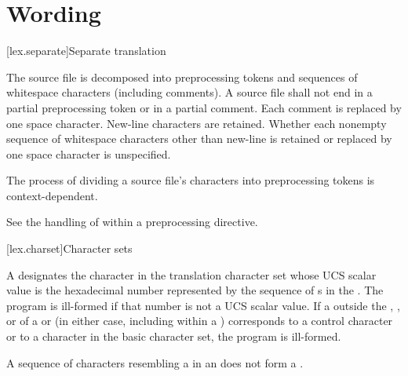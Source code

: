 \documentclass{wg21}
\begin{document}
\section{Wording}

[lex.separate]{Separate translation}


 The source file is decomposed into preprocessing
tokens and sequences of whitespace characters
(including comments). A source file shall not end in a partial
preprocessing token or in a partial comment.
Each comment is replaced by one space character. New-line characters are
retained. Whether each nonempty sequence of whitespace characters other
than new-line is retained or replaced by one space character is
unspecified.

The process of dividing a source file's
characters into preprocessing tokens is context-dependent.
\begin{example}
    See the handling of \tcode{<} within a  preprocessing
    directive.
\end{example}

[lex.charset]{Character sets}

A 
designates the character in the translation character set
whose UCS scalar value is the hexadecimal number represented by
the sequence of s
in the .
The program is ill-formed if that number is not a UCS scalar value.
If a  outside
the , , or
 of
a  or 
(in either case, including within a )
corresponds to a control character or
to a character in the basic character set, the program is ill-formed.
\begin{note}
    A sequence of characters resembling a  in an
     does not form a
    .
\end{note}
\end{document}
